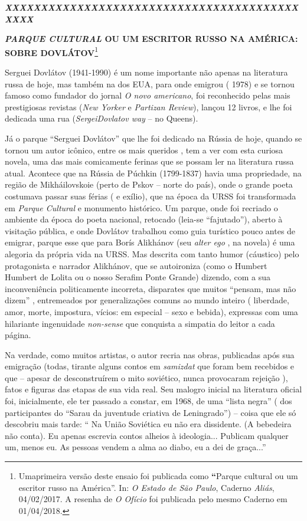 \emph{\textbf{XXXXXXXXXXXXXXXXXXXXXXXXXXXXXXXXXXXXXXXXXXXXX}}

\textbf{\emph{PARQUE CULTURAL} OU UM ESCRITOR RUSSO NA AMÉRICA: SOBRE
DOVLÁTOV}\footnote{Umaprimeira versão deste ensaio foi publicada como
  \textbf{``}Parque cultural ou um escritor russo na América''. In:
  \emph{O Estado de São Paulo}, Caderno \emph{Aliás}, 04/02/2017. A
  resenha de \emph{O Ofício} foi publicada pelo mesmo Caderno em
  01/04/2018.}

Serguei Dovlátov (1941-1990) é um nome importante não apenas na
literatura russa de hoje, mas também na dos EUA, para onde emigrou (
1978) e se tornou famoso como fundador do jornal \emph{O novo
americano}, foi reconhecido pelas mais prestigiosas revistas (\emph{New
Yorker} e \emph{Partizan Review}), lançou 12 livros, e lhe foi dedicada
uma rua (\emph{SergeiDovlatov way} -- no Queens).

Já o parque ``Serguei Dovlátov'' que lhe foi dedicado na Rússia de hoje,
quando se tornou um autor icônico, entre os mais queridos , tem a ver
com esta curiosa novela, uma das mais comicamente ferinas que se possam
ler na literatura russa atual. Acontece que na Rússia de Púchkin
(1799-1837) havia uma propriedade, na região de Mikháilovskoie (perto de
Pskov -- norte do país), onde o grande poeta costumava passar suas
férias ( e exílio), que na época da URSS foi transformada em
\emph{Parque Cultural} e monumento histórico. Um parque, onde foi
recriado o ambiente da época do poeta nacional, retocado (leia-se
``fajutado''), aberto à visitação pública, e onde Dovlátov trabalhou
como guia turístico pouco antes de emigrar, parque esse que para Borís
Alikhánov (seu \emph{alter ego} , na novela) é uma alegoria da própria
vida na URSS. Mas descrita com tanto humor (cáustico) pelo protagonista
e narrador Alikhánov, que se autoironiza (como o Humbert Humbert de
Lolita ou o nosso Serafim Ponte Grande) dizendo, com a sua
inconveniência politicamente incorreta, disparates que muitos ``pensam,
mas não dizem'' , entremeados por generalizações comuns ao mundo inteiro
( liberdade, amor, morte, impostura, vícios: em especial -- sexo e
bebida), expressas com uma hilariante ingenuidade \emph{non-sense} que
conquista a simpatia do leitor a cada página.

Na verdade, como muitos artistas, o autor recria nas obras, publicadas
após sua emigração (todas, tirante alguns contos em \emph{samizdat} que
foram bem recebidos e que -- apesar de desconstruírem o mito soviético,
nunca provocaram rejeição ), fatos e figuras das etapas de sua vida
real. Seu malogro inicial na literatura oficial foi, inicialmente, ele
ter passado a constar, em 1968, de uma ``lista negra'' ( dos
participantes do ``Sarau da juventude criativa de Leningrado'') -- coisa
que ele só descobriu mais tarde: `` Na União Soviética eu não era
dissidente. (A bebedeira não conta). Eu apenas escrevia contos alheios à
ideologia... Publicam qualquer um, menos eu. As pessoas vendem a alma ao
diabo, eu a dei de graça...''

